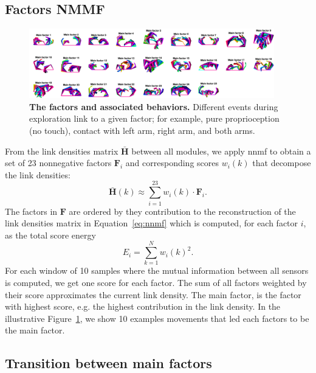 \subsection{Factors NMMF}
\begin{figure}[!t]
	\begin{center}
		\hspace*{\fill}
		\includegraphics[width=0.95\textwidth]{fig/movement_mainfactors_horizontal.png}
		\hspace*{\fill}
	\end{center}
	\caption{\textbf{The factors and associated behaviors.} Different events during exploration link to a given factor; for example, pure proprioception (no touch), contact with left arm, right arm, and both arms.}
    \label{fig:main_factors}
\end{figure}
From the link densities matrix $\bar{\bm{H}}$ between all modules, we apply \ac{nnmf} to obtain a set of 23 nonnegative factors $\mathbf{F}_i$ and corresponding scores $w_i(k)$ that decompose the link densities:
\begin{equation}
    \bar{\bm{H}}(k)\approx \sum_{i=1}^{23} w_i(k)\cdot\mathbf{F}_i.
\end{equation}
The factors in $\mathbf{F}$ are ordered by they contribution to the reconstruction of the link densities matrix in Equation~\ref{eq:nnmf} which is computed, for each factor $i$, as the total score energy
\begin{equation}
    E_i =  \sum_{k=1}^N w_i(k)^2.
\end{equation}
For each window of 10 samples where the mutual information between all sensors is computed, we get one score for each factor. The sum of all factors weighted by their score approximates the current link density. The main factor, is the factor with highest score, e.g. the highest contribution in the link density.  In the illustrative Figure~\ref{fig:main_factors}, we show 10 examples movements that led each  factors to be the main factor.

\subsection{Transition between main factors}

